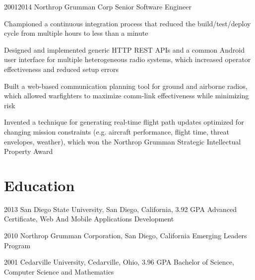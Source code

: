 \documentclass[9pt]{article}
\begin{document}
\job
  {2001}{2014}
  {Northrop Grumman Corp}
  {Senior Software Engineer}
  {\begin{achievements}
    \item Championed a continuous integration process that reduced the build/test/deploy cycle from multiple hours to less than a minute
    \item Designed and implemented generic HTTP REST APIs and a common Android user interface for multiple heterogeneous radio systems, which increased operator effectiveness and reduced setup errors
    \item Built a web-based communication planning tool for ground and airborne radios, which allowed warfighters to maximize comm-link effectiveness while minimizing risk
    \item Invented a technique for generating real-time flight path updates optimized for changing mission constraints (e.g. aircraft performance, flight time, threat envelopes, weather), which won the Northrop Grumman Strategic Intellectual Property Award
  \end{achievements}}


\section{Education}

\education
  {2013}
  {San Diego State University, San Diego, California, 3.92 GPA}
  {Advanced Certificate, Web And Mobile Applications Development}

\education
  {2010}
  {Northrop Grumman Corporation, San Diego, California}
  {Emerging Leaders Program}

\education
  {2001}
  {Cedarville University, Cedarville, Ohio, 3.96 GPA}
  {Bachelor of Science, Computer Science and Mathematics}


\section{}

\credits
\end{document}
